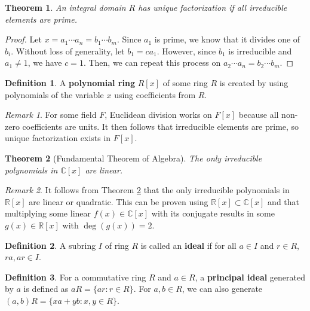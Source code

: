 \documentclass[
    parskip=half,
    toc=flat,
    toc=sectionentrydotfill,
]{scrartcl}  %
\theoremstyle{definition}
\newtheorem{definition}{Definition}[section]
\theoremstyle{plain}
\newtheorem{theorem}{Theorem}[definition]
\theoremstyle{remark}
\newtheorem{remark}{Remark}[definition]
\begin{document}
\begin{theorem}
    \label{thm:unique factorization}
    An integral domain $R$ has unique factorization if all irreducible elements
    are prime.
\end{theorem}

\begin{proof}
    Let $x=a_1\cdots a_n=b_1\cdots b_m$.
    Since $a_1$ is prime, we know that it divides one of $b_i$.
    Without loss of generality, let $b_1=ca_1$.
    However, since $b_1$ is irreducible and $a_1\neq 1$, we have $c=1$.
    Then, we can repeat this process on $a_2\cdots a_n=b_2\cdots b_m$.
\end{proof}

\begin{definition}
    A \textbf{polynomial ring} $R[x]$ of some ring $R$ is created by using
    polynomials of the variable $x$ using coefficients from $R$.
\end{definition}

\begin{remark}
    For some field $F$, Euclidean division works on $F[x]$ because all non-zero
    coefficients are units.
    It then follows that irreducible elements are prime, so unique factorization
    exists in $F[x]$.
\end{remark}

\begin{theorem}[Fundamental Theorem of Algebra]
    \label{thm:fundamental theorem of algebra}
    The only irreducible polynomials in $\mathbb{C}[x]$ are linear.
\end{theorem}

\begin{remark}
    It follows from Theorem \ref{thm:fundamental theorem of algebra} that the
    only irreducible polynomials in $\mathbb{R}[x]$ are linear or quadratic.
    This can be proven using $\mathbb{R}[x]\subset\mathbb{C}[x]$ and that
    multiplying some linear $f(x)\in\mathbb{C}[x]$ with its conjugate results
    in some $g(x)\in\mathbb{R}[x]$ with $\deg(g(x))=2$.
\end{remark}

\begin{definition}
    A subring $I$ of ring $R$ is called an \textbf{ideal} if for all
    $a\in I$ and $r\in R$, $ra,ar\in I$.
\end{definition}

\begin{definition}
    For a commutative ring $R$ and $a\in R$, a \textbf{principal ideal}
    generated by $a$ is defined as $aR=\{ar:r\in R\}$.
    For $a,b\in R$, we can also generate $(a,b)R=\{xa+yb:x,y\in R\}$.
\end{definition}
\end{document}
